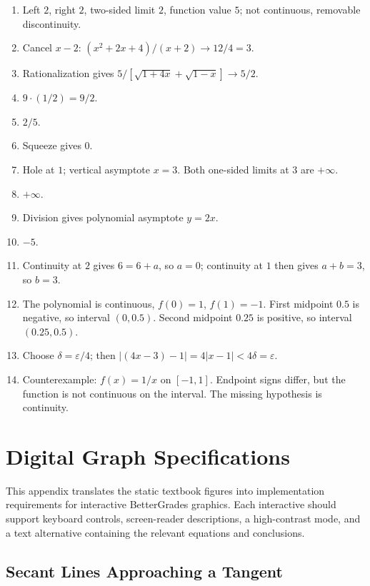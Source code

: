\documentclass[11pt,openany]{book}
\theoremstyle{bgplain}
\newcommand{\eps}{\varepsilon}
\begin{document}
\begin{enumerate}[label=\textbf{B\arabic*.}]
  \item Left \(2\), right \(2\), two-sided limit \(2\), function value \(5\); not continuous, removable discontinuity.
  \item Cancel \(x-2\): \((x^2+2x+4)/(x+2)\to12/4=3\).
  \item Rationalization gives \(5/[\sqrt{1+4x}+\sqrt{1-x}]\to5/2\).
  \item \(9\cdot(1/2)=9/2\).
  \item \(2/5\).
  \item Squeeze gives \(0\).
  \item Hole at \(1\); vertical asymptote \(x=3\). Both one-sided limits at \(3\) are \(+\infty\).
  \item \(+\infty\).
  \item Division gives polynomial asymptote \(y=2x\).
  \item \(-5\).
  \item Continuity at \(2\) gives \(6=6+a\), so \(a=0\); continuity at \(1\) then gives \(a+b=3\), so \(b=3\).
  \item The polynomial is continuous, \(f(0)=1\), \(f(1)=-1\). First midpoint \(0.5\) is negative, so interval \((0,0.5)\). Second midpoint \(0.25\) is positive, so interval \((0.25,0.5)\).
  \item Choose \(\delta=\eps/4\); then \(|(4x-3)-1|=4|x-1|<4\delta=\eps\).
  \item Counterexample: \(f(x)=1/x\) on \([-1,1]\). Endpoint signs differ, but the function is not continuous on the interval. The missing hypothesis is continuity.
\end{enumerate}



\chapter{Digital Graph Specifications}

This appendix translates the static textbook figures into implementation requirements for interactive BetterGrades graphics. Each interactive should support keyboard controls, screen-reader descriptions, a high-contrast mode, and a text alternative containing the relevant equations and conclusions.

\section{Secant Lines Approaching a Tangent}
\end{document}
